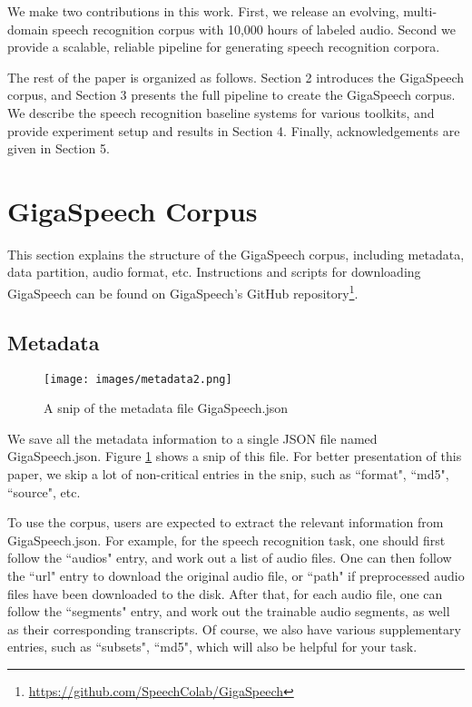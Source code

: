 \documentclass[a4paper]{article}
\begin{document}
We make two contributions in this work. First, we release an evolving,
multi-domain speech recognition corpus with 10,000 hours of labeled audio.
Second we provide a scalable, reliable pipeline for generating speech
recognition corpora.

The rest of the paper is organized as follows. Section 2 introduces the
GigaSpeech corpus, and Section 3 presents the full pipeline to create the
GigaSpeech corpus. We describe the speech recognition baseline systems for various
toolkits, and provide experiment setup and results in Section 4.
Finally, acknowledgements are given in Section 5.

\section{GigaSpeech Corpus}
This section explains the structure of the GigaSpeech corpus, including
metadata, data partition, audio format, etc. Instructions and scripts for downloading GigaSpeech can be found on GigaSpeech's GitHub repository\footnote{\url{https://github.com/SpeechColab/GigaSpeech}\label{foot:gigaspeech_repo}}.

\subsection{Metadata}
\begin{figure}[t]
  \centering
  \texttt{[image: images/metadata2.png]}
  \vspace{-5ex}
  \caption{A snip of the metadata file GigaSpeech.json}
  \label{fig:metadata}
\end{figure}


We save all the metadata information to a single JSON file named GigaSpeech.json.
Figure \ref{fig:metadata} shows a snip of this file. For better presentation of
this paper, we skip a lot of non-critical entries in the snip, such as
``format", ``md5", ``source", etc. 

To use the corpus, users are expected to extract the relevant information from
GigaSpeech.json. For example, for the speech recognition task, one should first
follow the ``audios" entry, and work out a list of audio files. One can then
follow the ``url" entry to download the original audio file, or ``path" if
preprocessed audio files have been downloaded to the disk. After that, for each
audio file, one can follow the ``segments" entry, and work out the trainable
audio segments, as well as their corresponding transcripts. Of course, we also
have various supplementary entries, such as ``subsets", ``md5", which will also
be helpful for your task.
\end{document}
